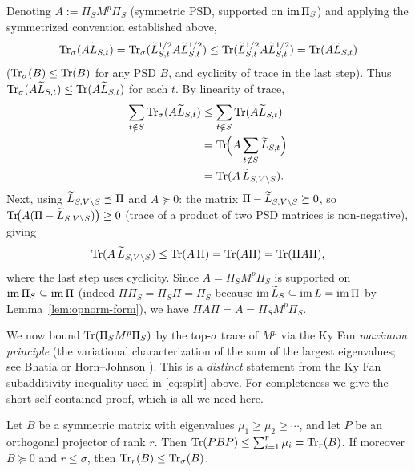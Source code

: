 Denoting $A:=\Pi_S M^p\Pi_S$ (symmetric PSD, supported on $\operatorname{im}\Pi_S$) and
applying the symmetrized convention established above,
\[
\operatorname{Tr}_{\sigma}(A\widetilde{L}_{S,t})
  =\operatorname{Tr}_{\sigma}(\widetilde{L}_{S,t}^{1/2}A\widetilde{L}_{S,t}^{1/2})
  \le\operatorname{Tr}(\widetilde{L}_{S,t}^{1/2}A\widetilde{L}_{S,t}^{1/2})
  =\operatorname{Tr}(A\widetilde{L}_{S,t})
\]
($\operatorname{Tr}_{\sigma}(B)\le\operatorname{Tr}(B)$ for any PSD $B$, and cyclicity of trace in the last step).
Thus $\operatorname{Tr}_{\sigma}(A\widetilde{L}_{S,t})\le\operatorname{Tr}(A\widetilde{L}_{S,t})$ for each $t$. By linearity of trace,
\[
\begin{aligned}
\sum_{t\notin S}\operatorname{Tr}_{\sigma}(A\widetilde{L}_{S,t})
  &\le\sum_{t\notin S}\operatorname{Tr}(A\widetilde{L}_{S,t})\\
  &= \operatorname{Tr}\!\Bigl(A\sum_{t\notin S}\widetilde{L}_{S,t}\Bigr)\\
  &= \operatorname{Tr}(A\,\widetilde{L}_{S,V\setminus S}).
\end{aligned}
\]
Next, using $\widetilde{L}_{S,V\setminus S}\preceq\Pi$ and $A\succeq0$: the matrix
$\Pi-\widetilde{L}_{S,V\setminus S}\succeq0$, so $\operatorname{Tr}\!\bigl(A(\Pi-\widetilde{L}_{S,V\setminus S})\bigr)\ge0$
(trace of a product of two PSD matrices is non-negative), giving
\[
\operatorname{Tr}(A\,\widetilde{L}_{S,V\setminus S})\le\operatorname{Tr}(A\,\Pi)=\operatorname{Tr}(A\Pi)=\operatorname{Tr}(\Pi A\Pi),
\]
where the last step uses cyclicity. Since $A=\Pi_S M^p\Pi_S$ is supported on
$\operatorname{im}\Pi_S\subseteq\operatorname{im}\Pi$ (indeed $\Pi\Pi_S=\Pi_S\Pi=\Pi_S$ because
$\operatorname{im}\widetilde{L}_S\subseteq\operatorname{im} L=\operatorname{im}\Pi$ by Lemma~\ref{lem:opnorm-form}),
we have $\Pi A\Pi=A=\Pi_S M^p\Pi_S$.

We now bound $\operatorname{Tr}(\Pi_S M^p\Pi_S)$ by the top-$\sigma$ trace of $M^p$ via the
Ky Fan \emph{maximum principle} (the variational characterization of the sum of the
largest eigenvalues; see Bhatia \cite[Cor.~III.4.4 and Problem~III.6.5]{Bhatia97}
or Horn--Johnson \cite[Cor.~4.3.39]{HJ12}). This is a \emph{distinct} statement
from the Ky Fan subadditivity inequality \cite[Thm.~4.3.47a]{HJ12} used in
\eqref{eq:split} above. For completeness we give the short self-contained proof,
which is all we need here.

\begin{qsixlemma}\label{lem:kyfan-max}
Let $B$ be a symmetric matrix with eigenvalues $\mu_1\ge\mu_2\ge\cdots$, and let
$P$ be an orthogonal projector of rank $r$. Then
$\operatorname{Tr}(PBP)\le\sum_{i=1}^{r}\mu_i=\operatorname{Tr}_r(B)$. If moreover $B\succeq0$ and
$r\le\sigma$, then $\operatorname{Tr}_r(B)\le\operatorname{Tr}_{\sigma}(B)$.
\end{qsixlemma}

